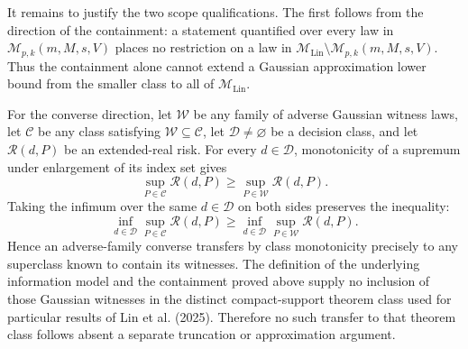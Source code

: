 It remains to justify the two scope qualifications.  The first follows
from the direction of the containment: a statement quantified over every
law in \(\mathcal M_{p,k}(m,M,s,V)\) places no restriction on a law in
\(\mathcal M_{\mathrm{Lin}}\setminus\mathcal M_{p,k}(m,M,s,V)\).
Thus the containment alone cannot extend a Gaussian approximation lower
bound from the smaller class to all of \(\mathcal M_{\mathrm{Lin}}\).

For the converse direction, let \(\mathcal W\) be any family of adverse
Gaussian witness laws, let \(\mathcal C\) be any class satisfying
\(\mathcal W\subseteq\mathcal C\), let \(\mathscr D\ne\varnothing\) be a
decision class, and let \(\mathcal R(d,P)\) be an extended-real risk.
For every \(d\in\mathscr D\), monotonicity of a supremum under enlargement
of its index set gives
\[
\sup_{P\in\mathcal C}\mathcal R(d,P)
\ge
\sup_{P\in\mathcal W}\mathcal R(d,P).
\]
Taking the infimum over the same \(d\in\mathscr D\) on both sides preserves
the inequality:
\[
\inf_{d\in\mathscr D}\sup_{P\in\mathcal C}\mathcal R(d,P)
\ge
\inf_{d\in\mathscr D}\sup_{P\in\mathcal W}\mathcal R(d,P).
\]
Hence an adverse-family converse transfers by class monotonicity precisely
to any superclass known to contain its witnesses.  The definition of the
underlying information model and the containment proved above supply no
inclusion of those Gaussian witnesses in the distinct compact-support
theorem class used for particular results of Lin et al. (2025).  Therefore
no such transfer to that theorem class follows absent a separate
truncation or approximation argument.
